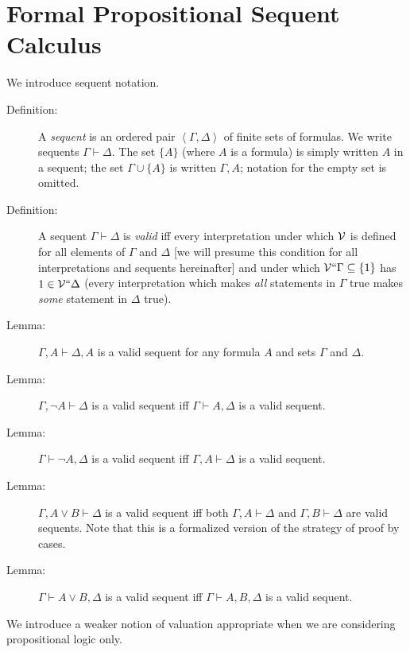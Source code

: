\documentclass[12pt]{book}
\begin{document}
\newpage
\section{Formal Propositional Sequent Calculus}

We introduce sequent notation.  

\begin{description}

\item[Definition:] A {\em sequent\/} is an ordered pair
$\left<\Gamma,\Delta\right>$ of finite sets of formulas.  We write
sequents $\Gamma \vdash \Delta$.  The set $\{A\}$ (where $A$ is a
formula) is simply written $A$ in a sequent; the set $\Gamma \cup
\{A\}$ is written $\Gamma,A$; notation for the empty set is omitted.

\item[Definition:] A sequent $\Gamma\vdash\Delta$ is {\em valid\/} iff
every interpretation under which $\cal V$ is defined for all elements
of $\Gamma$ and $\Delta$ [we will presume this condition for all
interpretations and sequents hereinafter] and under which ${\cal
V}``\Gamma \subseteq \{1\}$ has $1 \in {\cal V}``\Delta$ (every interpretation
which makes {\em all\/} statements in $\Gamma$ true makes {\em some\/}
statement in $\Delta$ true).

\item[Lemma:] $\Gamma,A \vdash \Delta,A$ is a valid sequent for any
formula $A$ and sets $\Gamma$ and $\Delta$.

\item[Lemma:] $\Gamma,\neg A \vdash \Delta$ is a valid sequent iff
$\Gamma \vdash A,\Delta$ is a valid sequent.

\item[Lemma:] $\Gamma \vdash \neg A,\Delta$ is a valid sequent iff
$\Gamma,A\vdash \Delta$ is a valid sequent.

\item[Lemma:] $\Gamma,A\vee B \vdash \Delta$ is a valid sequent iff
both $\Gamma,A \vdash \Delta$ and $\Gamma,B \vdash \Delta$ are valid
sequents.  Note that this is a formalized version of the strategy of
proof by cases.

\item[Lemma:] $\Gamma \vdash A \vee B,\Delta$ is a valid sequent iff
$\Gamma\vdash A,B,\Delta$ is a valid sequent.

\end{description}

We introduce a weaker notion of valuation appropriate when we are
considering propositional logic only.
\end{document}
